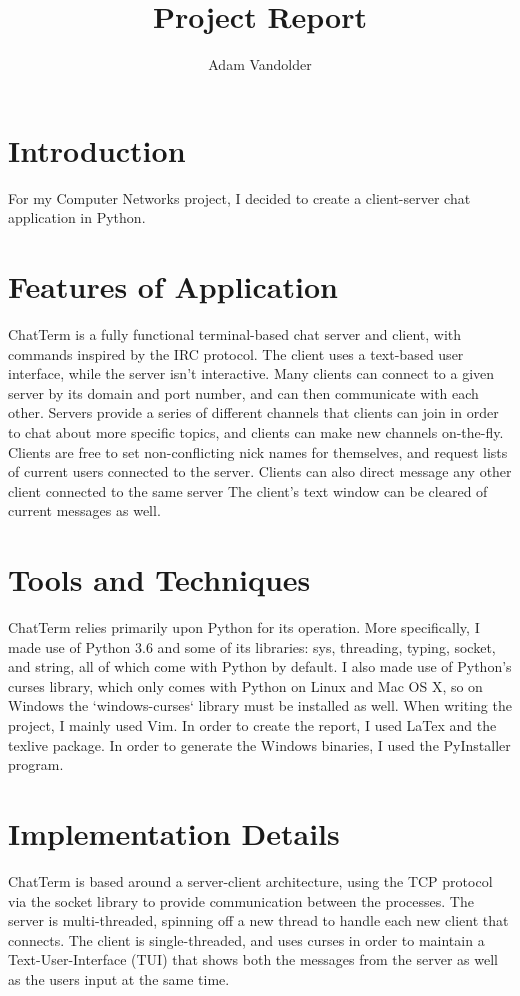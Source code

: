 \documentclass{article}
\title{Project Report}
\author{Adam Vandolder}
\date{}
\begin{document}
	\maketitle
    \tableofcontents
	\newpage
    \linespread{1.6}
    \selectfont

    \section{Introduction}
    For my Computer Networks project, I decided to create a client-server chat
    application in Python.
    \section{Features of Application}
    ChatTerm is a fully functional terminal-based chat server and client, with
    commands inspired by the IRC protocol. The client uses a text-based user
    interface, while the server isn't interactive. Many clients can connect to a
    given server by its domain and port number, and can then communicate with
    each other. Servers provide a series of different channels that clients can
    join in order to chat about more specific topics, and clients can make new
    channels on-the-fly. Clients are free to set non-conflicting nick names for
    themselves, and request lists of current users connected to the server.
    Clients can also direct message any other client connected to the same
    server The client's text window can be cleared of current messages as well.
    \section{Tools and Techniques}
    ChatTerm relies primarily upon Python for its operation.
    More specifically, I made use of Python 3.6 and some of its libraries: sys,
    threading, typing, socket, and string, all of which come with Python by
    default. I also made use of Python's curses library, which only comes with
    Python on Linux and Mac OS X, so on Windows the `windows-curses` library
    must be installed as well. When writing the project, I mainly used Vim. In
    order to create the report, I used LaTex and the texlive package. In order
    to generate the Windows binaries, I used the PyInstaller program.
    \section{Implementation Details}
    ChatTerm is based around a server-client architecture, using the TCP
    protocol via the socket library to provide communication between the
    processes. The server is multi-threaded, spinning off a new thread to handle
    each new client that connects. The client is single-threaded, and uses
    curses in order to maintain a Text-User-Interface (TUI) that shows both the
    messages from the server as well as the users input at the same time.
\end{document}
